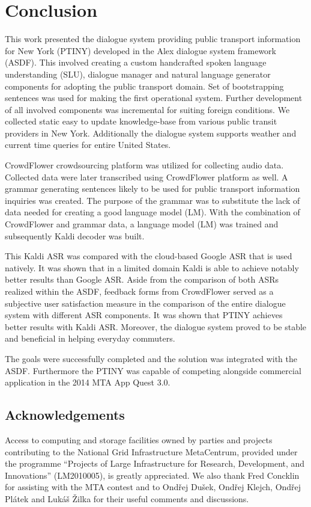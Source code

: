 \chapter*{Conclusion}

This work presented the dialogue system providing public transport information for New York (PTINY) developed in the Alex dialogue system framework (ASDF).
This involved creating a custom handcrafted spoken language understanding (SLU), dialogue manager and natural language generator components for adopting the public transport domain.
Set of bootstrapping sentences was used for making the first operational system.
Further development of all involved components was incremental for suiting foreign conditions.
We collected static easy to update knowledge-base from various public transit providers in New York.
Additionally the dialogue system supports weather and current time queries for entire United States.

CrowdFlower crowdsourcing platform was utilized for collecting audio data.
Collected data were later transcribed using CrowdFlower platform as well.
A grammar generating sentences likely to be used for public transport information inquiries was created.
The purpose of the grammar was to substitute the lack of data needed for creating a good language model (LM).
With the combination of CrowdFlower and grammar data, a language model (LM) was trained and subsequently Kaldi decoder was built.

This Kaldi ASR was compared with the cloud-based Google ASR that is used natively.
It was shown that in a limited domain Kaldi is able to achieve notably better results than Google ASR.
Aside from the comparison of both ASRs realized within the ASDF, feedback forms from CrowdFlower served as a subjective user satisfaction measure in the comparison of the entire dialogue system with different ASR components.
It was shown that PTINY achieves better results with Kaldi ASR.
Moreover, the dialogue system proved to be stable and beneficial in helping everyday commuters.

The goals were successfully completed and the solution was integrated with the ASDF.
Furthermore the PTINY was capable of competing alongside commercial application in the 2014 MTA App Quest 3.0.


\section{Acknowledgements}

Access to computing and storage facilities owned by parties and projects contributing to the National Grid Infrastructure MetaCentrum, provided under the programme ``Projects of Large Infrastructure for Research, Development, and Innovations'' (LM2010005), is greatly appreciated. We also thank Fred Concklin for assisting with the MTA contest and to Ondřej Dušek, Ondřej Klejch, Ondřej Plátek and Lukáš Žilka for their useful comments and discussions.

